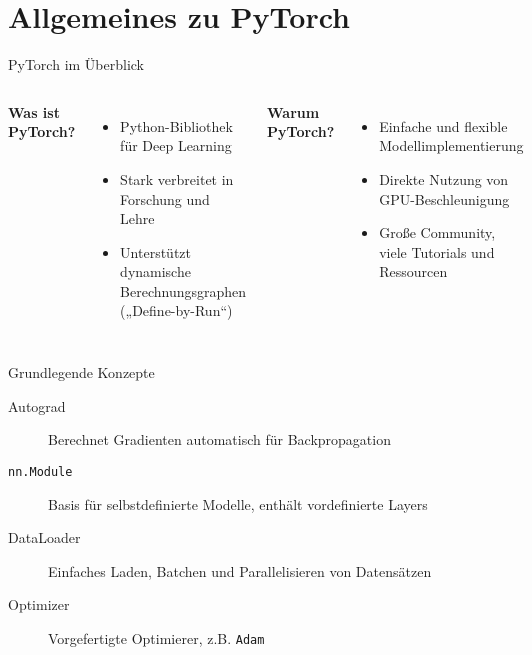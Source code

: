 \section{Allgemeines zu PyTorch}


\begin{frame}{PyTorch im Überblick}
    \begin{columns}[T,onlytextwidth]
        \textbf{Was ist PyTorch?}
        \begin{itemize}
            \item Python-Bibliothek für Deep Learning
            \item Stark verbreitet in Forschung und Lehre \cite{bauer}
            \item Unterstützt dynamische Berechnungsgraphen („Define-by-Run“)
        \end{itemize}

        \textbf{Warum PyTorch?}
        \begin{itemize}
            \item Einfache und flexible Modellimplementierung
            \item Direkte Nutzung von GPU-Beschleunigung
            \item Große Community, viele Tutorials und Ressourcen
        \end{itemize}
    \end{columns}
\end{frame}


\begin{frame}{Grundlegende Konzepte}
    \begin{description}
        \item[Autograd] Berechnet Gradienten automatisch für Backpropagation
        \item[\texttt{nn.Module}] Basis für selbstdefinierte Modelle, enthält vordefinierte Layers
        \item[DataLoader] Einfaches Laden, Batchen und \alert{Parallelisieren} von Datensätzen
        \item[Optimizer] Vorgefertigte Optimierer, z.B. \texttt{Adam}
    \end{description}
\end{frame}